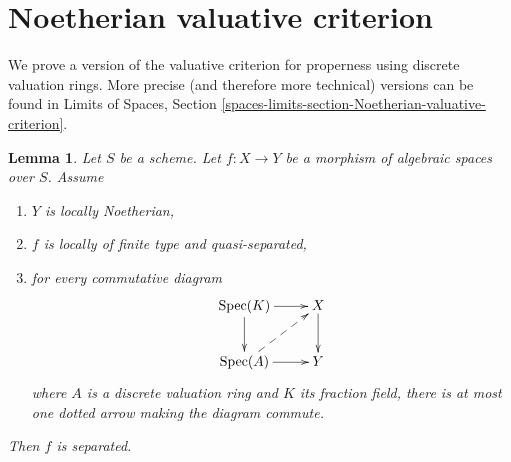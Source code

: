 \documentclass{stacks-project}
\theoremstyle{plain}
\newtheorem{lemma}[subsection]{Lemma}
\theoremstyle{definition}
\theoremstyle{remark}
\numberwithin{equation}{subsection}
\def\Spec{\mathop{\mathrm{Spec}}}
\begin{document}
\section{Noetherian valuative criterion}
\label{section-Noetherian-valuative-criterion}

\noindent
We prove a version of the valuative criterion for properness
using discrete valuation rings. More precise (and therefore more
technical) versions can be found in
Limits of Spaces, Section
\ref{spaces-limits-section-Noetherian-valuative-criterion}.

\begin{lemma}
\label{lemma-check-separated-dvr}
Let $S$ be a scheme. Let $f : X \to Y$ be a morphism of algebraic
spaces over $S$. Assume
\begin{enumerate}
\item $Y$ is locally Noetherian,
\item $f$ is locally of finite type and quasi-separated,
\item for every commutative diagram
$$
\xymatrix{
\Spec(K) \ar[r] \ar[d] & X \ar[d] \\
\Spec(A) \ar[r] \ar@{-->}[ru] & Y
}
$$
where $A$ is a discrete valuation ring and $K$ its fraction field,
there is at most one dotted arrow making the diagram commute.
\end{enumerate}
Then $f$ is separated.
\end{lemma}
\end{document}
